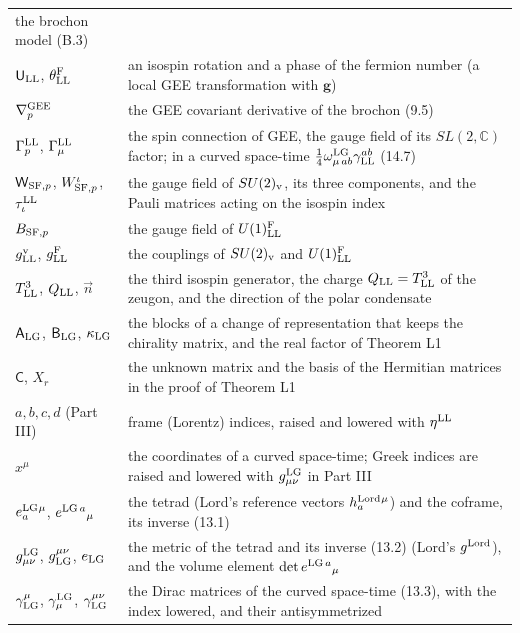\documentclass[
  10pt,
]{article}
\begin{document}
\begin{longtable}[]{@{}
  >{\raggedright\arraybackslash}p{}
  >{\raggedright\arraybackslash}p{}@{}}
the brochon model (B.3) \\
\(\mathsf U_{\rm LL}\), \(\theta^{\rm F}_{\rm LL}\) & an isospin
rotation and a phase of the fermion number (a local GEE transformation
with \(\mathbf g\)) \\
\(\nabla^{\rm GEE}_p\) & the GEE covariant derivative of the brochon
(9.5) \\
\(\Gamma^{\rm LL}_p\), \(\Gamma^{\rm LL}_\mu\) & the spin connection of
GEE, the gauge field of its \(SL(2,\mathbb C)\) factor; in a curved
space-time \(\tfrac14\omega^{\rm LG}_{\mu\,ab}\gamma^{ab}_{\rm LL}\)
(14.7) \\
\(\mathsf W_{{\rm SF},p}\), \(W^\iota_{{\rm SF},p}\),
\(\tau^{\rm LL}_\iota\) & the gauge field of \(SU(2)_{\rm v}\), its
three components, and the Pauli matrices acting on the isospin index \\
\(B_{{\rm SF},p}\) & the gauge field of \(U(1)^{\rm F}_{\rm LL}\) \\
\(g^{\rm v}_{\rm LL}\), \(g^{\rm F}_{\rm LL}\) & the couplings of
\(SU(2)_{\rm v}\) and \(U(1)^{\rm F}_{\rm LL}\) \\
\(T^3_{\rm LL}\), \(Q_{\rm LL}\), \(\vec n\) & the third isospin
generator, the charge \(Q_{\rm LL}=T^3_{\rm LL}\) of the zeugon, and the
direction of the polar condensate \\
\(\mathsf A_{\rm LG}\), \(\mathsf B_{\rm LG}\), \(\kappa_{\rm LG}\) &
the blocks of a change of representation that keeps the chirality
matrix, and the real factor of Theorem L1 \\
\(\mathsf C\), \(X_r\) & the unknown matrix and the basis of the
Hermitian matrices in the proof of Theorem L1 \\
\(a,b,c,d\) (Part III) & frame (Lorentz) indices, raised and lowered
with \(\eta^{\rm LL}\) \\
\(x^\mu\) & the coordinates of a curved space-time; Greek indices are
raised and lowered with \(g^{\rm LG}_{\mu\nu}\) in Part III \\
\(e^{\rm LG}_a{}^\mu\), \(e^{{\rm LG}\,a}{}_\mu\) & the tetrad (Lord's
reference vectors \(h^{\rm Lord}_a{}^\mu\)) and the coframe, its inverse
(13.1) \\
\(g^{\rm LG}_{\mu\nu}\), \(g_{\rm LG}^{\mu\nu}\), \(e_{\rm LG}\) & the
metric of the tetrad and its inverse (13.2) (Lord's \(g^{\rm Lord}\)),
and the volume element \(\det e^{{\rm LG}\,a}{}_\mu\) \\
\(\gamma^\mu_{\rm LG}\), \(\gamma^{\rm LG}_\mu\),
\(\gamma^{\mu\nu}_{\rm LG}\) & the Dirac matrices of the curved
space-time (13.3), with the index lowered, and their antisymmetrized

\end{longtable}
\end{document}
